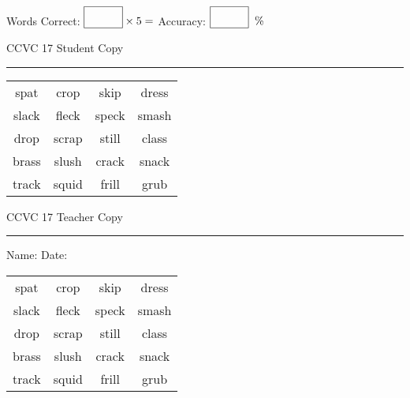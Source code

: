 \documentclass{memoir}
\begin{document}
\small

Words Correct: $\fbox{\phantom{\huge 100}} \times 5 = $ Accuracy: $\fbox{\phantom{\huge 100}}\;\; \%$ 

\vfill

\newpage


\footnotesize \noindent
CCVC 17 \hfill Student Copy
\smallskip
\hrule

\Large

\setlength{\tabcolsep}{14pt}
\def\arraystretch{3}

{\selectfont


\begin{vplace}[0.5]
\begin{center}
\begin{tabular}{cccc}
spat            & crop & skip & dress \\
slack            & fleck             & speck & smash \\
drop & scrap & still & class             \\
brass       & slush & crack       & snack \\
track       & squid & frill & grub \\
\end{tabular}
\end{center}
\end{vplace}

}

\newpage

\footnotesize \noindent
CCVC 17 \hfill Teacher Copy
\smallskip
\hrule

\small

\vfill

\noindent
Name: \underline{\hspace{1.75in}} \hfill Date: \underline{\hspace{1in}}

\Large

{\selectfont


\begin{vplace}[0.5]
\begin{center}
\begin{tabular}{cccc}
spat            & crop & skip & dress \\
slack            & fleck             & speck & smash \\
drop & scrap & still & class             \\
brass       & slush & crack       & snack \\
track       & squid & frill & grub \\
\end{tabular}
\end{center}
\end{vplace}



}
\end{document}
